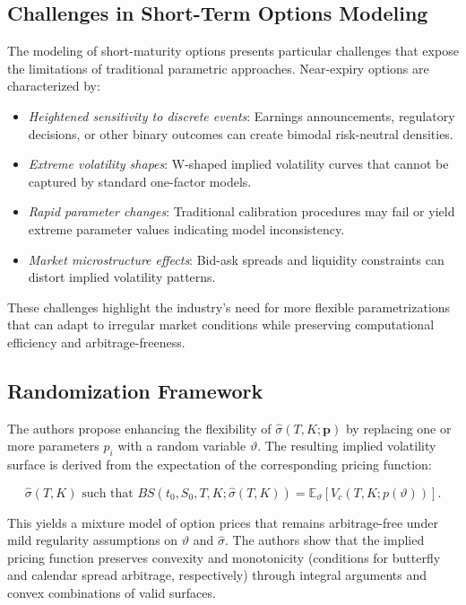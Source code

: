 \subsection{Challenges in Short-Term Options Modeling}

The modeling of short-maturity options presents particular challenges that expose the limitations of traditional parametric approaches. Near-expiry options are characterized by:

\begin{itemize}
    \item \textit{Heightened sensitivity to discrete events}: Earnings announcements, regulatory decisions, or other binary outcomes can create bimodal risk-neutral densities.
    \item \textit{Extreme volatility shapes}: W-shaped implied volatility curves that cannot be captured by standard one-factor models.
    \item \textit{Rapid parameter changes}: Traditional calibration procedures may fail or yield extreme parameter values indicating model inconsistency.
    \item \textit{Market microstructure effects}: Bid-ask spreads and liquidity constraints can distort implied volatility patterns.
\end{itemize}

These challenges highlight the industry's need for more flexible parametrizations that can adapt to irregular market conditions while preserving computational efficiency and arbitrage-freeness.

\subsection{Randomization Framework}

The authors propose enhancing the flexibility of $\hat{\sigma}(T,K; \mathbf{p})$ by replacing one or more parameters $p_i$ with a random variable $\vartheta$. The resulting implied volatility surface is derived from the expectation of the corresponding pricing function:

\[
    \hat{\sigma}(T,K) \text{ such that } BS(t_0, S_0, T, K; \hat{\sigma}(T,K)) = \mathbb{E}_{\vartheta}[V_c(T,K; p(\vartheta))].
\]

This yields a mixture model of option prices that remains arbitrage-free under mild regularity assumptions on $\vartheta$ and $\hat{\sigma}$. The authors show that the implied pricing function preserves convexity and monotonicity (conditions for butterfly and calendar spread arbitrage, respectively) through integral arguments and convex combinations of valid surfaces.

